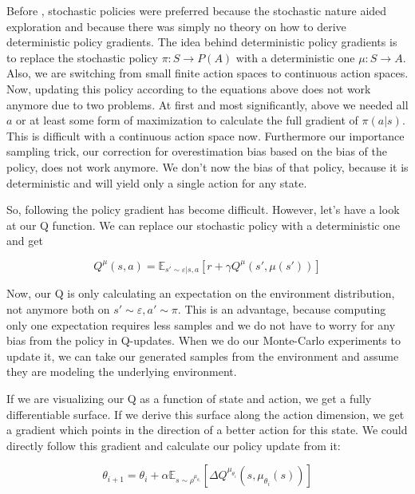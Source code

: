 \documentclass[hyperref,final,beleg]{cgvpub}
\begin{document}
Before \cite{silverDeterministicPolicyGradient2013}, stochastic policies were preferred because the stochastic nature aided exploration and because there was simply no theory on how to derive deterministic policy gradients. The idea behind deterministic policy gradients is to replace the stochastic policy $\pi: S \rightarrow P(A)$ with a deterministic one $\mu: S \rightarrow A$. Also, we are switching from small finite action spaces to continuous action spaces. Now, updating this policy according to the equations above does not work anymore due to two problems. At first and most significantly, above we needed all $a$ or at least some form of maximization to calculate the full gradient of $\pi(a|s)$. This is difficult with a continuous action space now. Furthermore our importance sampling trick, our correction for overestimation bias based on the bias of the policy, does not work anymore. We don't now the bias of that policy, because it is deterministic and will yield only a single action for any state. 

So, following the policy gradient has become difficult. However, let's have a look at our Q function. We can replace our stochastic policy with a deterministic one and get

\begin{equation}
Q^{\mu}(s,a) = \mathbb{E}_{s' \sim \varepsilon | s,a}[r + \gamma Q^{\mu}(s', \mu(s'))]
\end{equation}

Now, our Q is only calculating an expectation on the environment distribution, not anymore both on $s' \sim \varepsilon, a' \sim \pi$. This is an advantage, because computing only one expectation requires less samples and we do not have to worry for any bias from the policy in Q-updates. When we do our Monte-Carlo experiments to update it, we can take our generated samples from the environment and assume they are modeling the underlying environment.

If we are visualizing our Q as a function of state and action, we get a fully differentiable surface. If we derive this surface along the action dimension, we get a gradient which points in the direction of a better action for this state. We could directly follow this gradient and calculate our policy update from it:

\begin{equation}
\theta_{i+1} = \theta_i + \alpha \mathbb{E}_{s \sim \rho^{\mu_{\theta_i}}}[\Delta Q^{\mu_{\theta_i}}(s, \mu_{\theta_i}(s))]
\end{equation}
\end{document}
